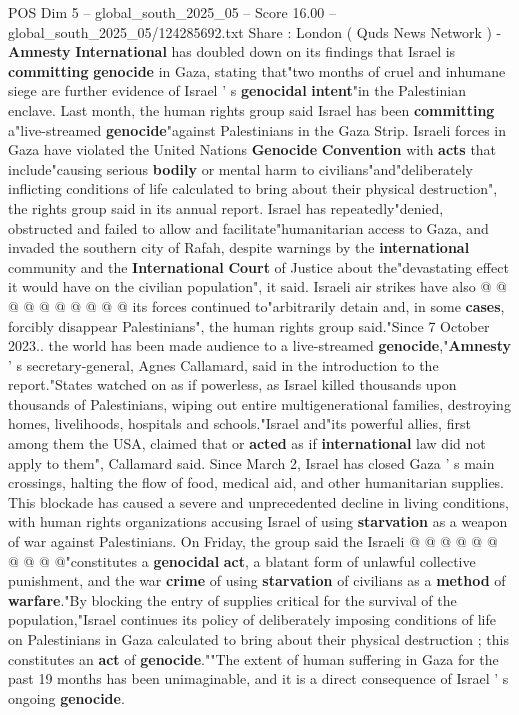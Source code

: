\begin{textsample}{POS Dim 5 – global\_south\_2025\_05 – Score 16.00 – global\_south\_2025\_05/124285692.txt}  \label{ex:f5_pos_119}
Share : London ( Quds News Network ) - \textbf{Amnesty} \textbf{International} has doubled down on its findings that Israel is \textbf{committing} \textbf{genocide} in Gaza, stating that"two months of cruel and inhumane siege are further evidence of Israel ' s \textbf{genocidal} \textbf{intent}"in the Palestinian enclave.
Last month, the human rights group said Israel has been \textbf{committing} a"live-streamed \textbf{genocide}"against Palestinians in the Gaza Strip.
Israeli forces in Gaza have violated the United Nations \textbf{Genocide} \textbf{Convention} with \textbf{acts} that include"causing serious \textbf{bodily} or mental harm to civilians"and"deliberately inflicting conditions of life calculated to bring about their physical destruction", the rights group said in its annual report.
Israel has repeatedly"denied, obstructed and failed to allow and facilitate"humanitarian access to Gaza, and invaded the southern city of Rafah, despite warnings by the \textbf{international} community and the \textbf{International} \textbf{Court} of Justice about the"devastating effect it would have on the civilian population", it said.
Israeli air strikes have also @ @ @ @ @ @ @ @ @ @ its forces continued to"arbitrarily detain and, in some \textbf{cases}, forcibly disappear Palestinians", the human rights group said."Since 7 October 2023.. the world has been made audience to a live-streamed \textbf{genocide},"\textbf{Amnesty} ' s secretary-general, Agnes Callamard, said in the introduction to the report."States watched on as if powerless, as Israel killed thousands upon thousands of Palestinians, wiping out entire multigenerational families, destroying homes, livelihoods, hospitals and schools."Israel and"its powerful allies, first among them the USA, claimed that or \textbf{acted} as if \textbf{international} law did not apply to them", Callamard said.
Since March 2, Israel has closed Gaza ' s main crossings, halting the flow of food, medical aid, and other humanitarian supplies.
This blockade has caused a severe and unprecedented decline in living conditions, with human rights organizations accusing Israel of using \textbf{starvation} as a weapon of war against Palestinians.
On Friday, the group said the Israeli @ @ @ @ @ @ @ @ @ @"constitutes a \textbf{genocidal} \textbf{act}, a blatant form of unlawful collective punishment, and the war \textbf{crime} of using \textbf{starvation} of civilians as a \textbf{method} of \textbf{warfare}."By blocking the entry of supplies critical for the survival of the population,"Israel continues its policy of deliberately imposing conditions of life on Palestinians in Gaza calculated to bring about their physical destruction ; this constitutes an \textbf{act} of \textbf{genocide}.""The extent of human suffering in Gaza for the past 19 months has been unimaginable, and it is a direct consequence of Israel ' s ongoing \textbf{genocide}.

\end{textsample}

